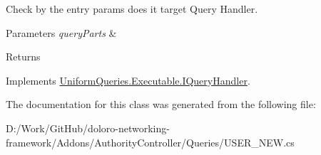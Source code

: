 Check by the entry params does it target Query Handler. 


\begin{DoxyParams}{Parameters}
{\em query\+Parts} & \\
\hline
\end{DoxyParams}
\begin{DoxyReturn}{Returns}

\end{DoxyReturn}


Implements \mbox{\hyperlink{interface_uniform_queries_1_1_executable_1_1_i_query_handler_a0f43184bf3e306a7cbebc39098f044ee}{Uniform\+Queries.\+Executable.\+I\+Query\+Handler}}.



The documentation for this class was generated from the following file\+:\begin{DoxyCompactItemize}
\item 
D\+:/\+Work/\+Git\+Hub/doloro-\/networking-\/framework/\+Addons/\+Authority\+Controller/\+Queries/U\+S\+E\+R\+\_\+\+N\+E\+W.\+cs\end{DoxyCompactItemize}

